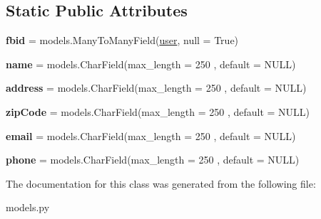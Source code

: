 \subsection*{Static Public Attributes}
\begin{DoxyCompactItemize}
\item 
\mbox{\label{classmessengerbot_1_1models_1_1address_a85dff36c313a4437aa39e7f2a83589ed}} 
{\bfseries fbid} = models.\+Many\+To\+Many\+Field(\hyperlink{classmessengerbot_1_1models_1_1user}{user}, null = True)
\item 
\mbox{\label{classmessengerbot_1_1models_1_1address_a549a6273b46ccb95313170df8a2f4223}} 
{\bfseries name} = models.\+Char\+Field(max\+\_\+length = 250 , default = \textquotesingle{}N\+U\+LL\textquotesingle{})
\item 
\mbox{\label{classmessengerbot_1_1models_1_1address_aa4c0c585dc31e3c740efcc53e07605cc}} 
{\bfseries address} = models.\+Char\+Field(max\+\_\+length = 250 , default = \textquotesingle{}N\+U\+LL\textquotesingle{})
\item 
\mbox{\label{classmessengerbot_1_1models_1_1address_aebe139c4196e462074da0a624bb6219c}} 
{\bfseries zip\+Code} = models.\+Char\+Field(max\+\_\+length = 250 , default = \textquotesingle{}N\+U\+LL\textquotesingle{})
\item 
\mbox{\label{classmessengerbot_1_1models_1_1address_a4ebf976d2d102ed86f8df2052367ece0}} 
{\bfseries email} = models.\+Char\+Field(max\+\_\+length = 250 , default = \textquotesingle{}N\+U\+LL\textquotesingle{})
\item 
\mbox{\label{classmessengerbot_1_1models_1_1address_a58db9d45a5fb58b321296870618deb7f}} 
{\bfseries phone} = models.\+Char\+Field(max\+\_\+length = 250 , default = \textquotesingle{}N\+U\+LL\textquotesingle{})
\end{DoxyCompactItemize}


The documentation for this class was generated from the following file\+:\begin{DoxyCompactItemize}
\item 
models.\+py\end{DoxyCompactItemize}
